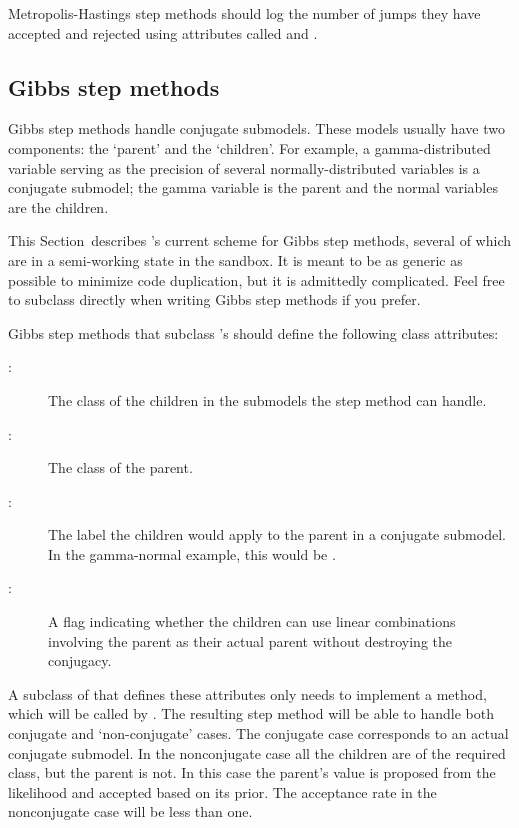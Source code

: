 \documentclass[]{jss}
\begin{document}
Metropolis-Hastings step methods should log the number of jumps they have accepted and rejected using attributes called  and .


\subsection{Gibbs step methods} \label{user-gibbs}


Gibbs step methods handle conjugate submodels. These models usually have two components: the `parent' and the `children'. For example, a gamma-distributed variable serving as the precision of several normally-distributed variables is a conjugate submodel; the gamma variable is the parent and the normal variables are the children.

This Section~describes 's current scheme for Gibbs step methods, several of which are in a semi-working state in the sandbox. It is meant to be as generic as possible to minimize code duplication, but it is admittedly complicated. Feel free to subclass  directly when writing Gibbs step methods if you prefer.

Gibbs step methods that subclass 's  should define the following class attributes:
\begin{description}
   \item[:] The class of the children in the submodels the step method can handle.
   \item[:] The class of the parent.
   \item[:] The label the children would apply to the parent in a conjugate submodel. In the gamma-normal example, this would be .
   \item[:] A flag indicating whether the children can use linear combinations involving the parent as their actual parent without destroying the conjugacy.
\end{description}

A subclass of  that defines these attributes only needs to implement a  method, which will be called by . The resulting step method will be able to handle both conjugate and `non-conjugate' cases. The conjugate case corresponds to an actual conjugate submodel. In the nonconjugate case all the children are of the required class, but the parent is not. In this case the parent's value is proposed from the likelihood and accepted based on its prior. The acceptance rate in the nonconjugate case will be less than one.
\end{document}
